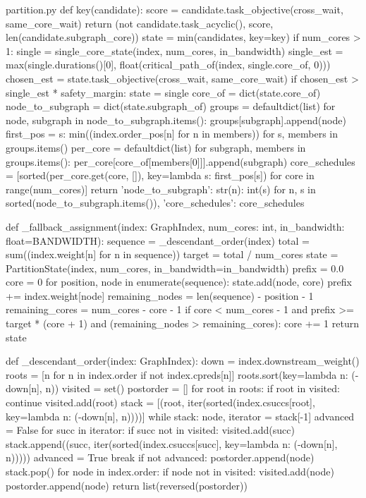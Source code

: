 \begin{Python}{partition.py}
    def key(candidate):
        score = candidate.task_objective(cross_wait, same_core_wait)
        return (not candidate.task_acyclic(), score, len(candidate.subgraph_core))
    state = min(candidates, key=key)
    if num_cores > 1:
        single = single_core_state(index, num_cores, in_bandwidth)
        single_est = max(single.durations()[0], float(critical_path_of(index, single.core_of, 0)))
        chosen_est = state.task_objective(cross_wait, same_core_wait)
        if chosen_est > single_est * safety_margin:
            state = single
    core_of = dict(state.core_of)
    node_to_subgraph = dict(state.subgraph_of)
    groups = defaultdict(list)
    for node, subgraph in node_to_subgraph.items():
        groups[subgraph].append(node)
    first_pos = {s: min((index.order_pos[n] for n in members)) for s, members in groups.items()}
    per_core = defaultdict(list)
    for subgraph, members in groups.items():
        per_core[core_of[members[0]]].append(subgraph)
    core_schedules = [sorted(per_core.get(core, []), key=lambda s: first_pos[s]) for core in range(num_cores)]
    return {'node_to_subgraph': {str(n): int(s) for n, s in sorted(node_to_subgraph.items())}, 'core_schedules': core_schedules}

def _fallback_assignment(index: GraphIndex, num_cores: int, in_bandwidth: float=BANDWIDTH):
    sequence = _descendant_order(index)
    total = sum((index.weight[n] for n in sequence))
    target = total / num_cores
    state = PartitionState(index, num_cores, in_bandwidth=in_bandwidth)
    prefix = 0.0
    core = 0
    for position, node in enumerate(sequence):
        state.add(node, core)
        prefix += index.weight[node]
        remaining_nodes = len(sequence) - position - 1
        remaining_cores = num_cores - core - 1
        if core < num_cores - 1 and prefix >= target * (core + 1) and (remaining_nodes > remaining_cores):
            core += 1
    return state

def _descendant_order(index: GraphIndex):
    down = index.downstream_weight()
    roots = [n for n in index.order if not index.cpreds[n]]
    roots.sort(key=lambda n: (-down[n], n))
    visited = set()
    postorder = []
    for root in roots:
        if root in visited:
            continue
        visited.add(root)
        stack = [(root, iter(sorted(index.csuccs[root], key=lambda n: (-down[n], n))))]
        while stack:
            node, iterator = stack[-1]
            advanced = False
            for succ in iterator:
                if succ not in visited:
                    visited.add(succ)
                    stack.append((succ, iter(sorted(index.csuccs[succ], key=lambda n: (-down[n], n)))))
                    advanced = True
                    break
            if not advanced:
                postorder.append(node)
                stack.pop()
    for node in index.order:
        if node not in visited:
            visited.add(node)
            postorder.append(node)
    return list(reversed(postorder))
\end{Python}

